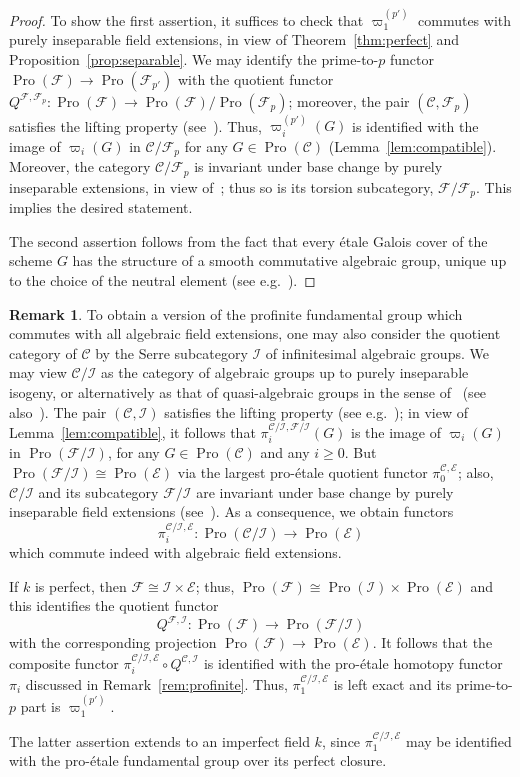 \documentclass[11pt]{article}
\theoremstyle{definition}
\newtheorem{rema}[theo]{Remark}
\numberwithin{equation}{section}
\newcommand\cC{{\mathcal C}}
\newcommand\cE{{\mathcal E}}
\newcommand\cF{{\mathcal F}}
\newcommand\cI{{\mathcal I}}
\DeclareMathOperator{\Pro}{Pro}
\theoremstyle{remark}
\begin{document}
\begin{proof}
To show the first assertion, it suffices to check that $\varpi_1^{(p')}$ commutes with purely inseparable field extensions, in view of Theorem~\ref{thm:perfect} and Proposition~\ref{prop:separable}. We may identify the prime-to-$p$ functor $\Pro(\cF) \to \Pro(\cF_{p'})$ with the quotient functor $Q^{\cF,\cF_p}: \Pro(\cF) \to \Pro(\cF)/\Pro(\cF_p)$; moreover, the pair $(\cC,\cF_p)$ satisfies the lifting property (see~\cite[Lem.~3.1]{Br17b}). Thus, $\varpi_i^{(p')}(G)$ is identified with the image of $\varpi_i(G)$ in $\cC/\cF_p$ for any $G \in \Pro(\cC)$ (Lemma~\ref{lem:compatible}). Moreover, the category $\cC/\cF_p$ is invariant under base change by purely inseparable extensions, in view of~\cite[Thm.~3.17]{Br17b}; thus so is its torsion subcategory, $\cF/\cF_p$. This implies the desired statement.

The second assertion follows from the fact that every
\'etale Galois cover of the scheme $G$ has the structure of a smooth commutative algebraic group, unique up to the choice of the neutral element (see e.g.~\cite[Prop.~1.1]{BS}).
\end{proof}

\begin{rema}\label{rem:proetale}
To obtain a version of the profinite fundamental group which commutes with all algebraic field extensions, one may also consider the quotient category of $\cC$ by the Serre subcategory $\cI$ of infinitesimal algebraic groups. We may view $\cC/\cI$ as the category of algebraic groups up to purely inseparable isogeny, or alternatively as that of quasi-algebraic groups in the sense of~\cite{Se60} (see also~\cite[V.3.4.5]{DG}). The pair $(\cC,\cI)$ satisfies the lifting property (see e.g.~\cite[Lem.~2.2]{Br17a}); in view of Lemma~\ref{lem:compatible}, it follows that $\pi_i^{\cC/\cI,\cF/\cI}(G)$ is the image of $\varpi_i(G)$ in $\Pro(\cF/\cI)$, for any $G \in \Pro(\cC)$ and any $i \geq 0$. But $\Pro(\cF/\cI) \cong \Pro(\cE)$ via the largest pro-\'etale quotient functor $\pi_0^{\cC,\cE}$; also, $\cC/\cI$ and its subcategory $\cF/\cI$ are invariant under base change by purely inseparable field extensions (see~\cite[Thm.~3.17]{Br17b}). As a consequence, we obtain functors
\[
\pi_i^{\cC/\cI,\cE} : \Pro(\cC/\cI) \longrightarrow \Pro(\cE)
\]
which commute indeed with algebraic field extensions.

If $k$ is perfect, then $\cF \cong \cI \times \cE$; thus, $\Pro(\cF) \cong \Pro(\cI) \times \Pro(\cE)$ and this identifies the quotient functor
\[
Q^{\cF,\cI} : \Pro(\cF) \longrightarrow \Pro(\cF/\cI)
\]
with the corresponding projection $\Pro(\cF) \to \Pro(\cE)$. It follows that the composite functor $\pi_i^{\cC/\cI,\cE} \circ Q^{\cC,\cI}$ is identified with the pro-\'etale homotopy functor $\pi_i$ discussed in Remark~\ref{rem:profinite}. Thus, $\pi_1^{\cC/\cI,\cE}$ is left exact and its prime-to-$p$ part is $\varpi_1^{(p')}$.

The latter assertion extends to an imperfect field $k$, since $\pi_1^{\cC/\cI,\cE}$ may be identified with the pro-\'etale fundamental group over its perfect closure.
\end{rema}
\end{document}

